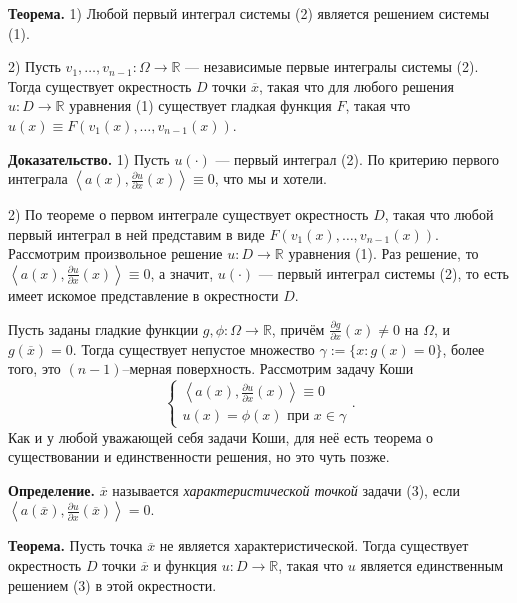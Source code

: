 \textbf{Теорема.} 1) Любой первый интеграл системы (2) является решением системы (1).

2) Пусть $v_1, \dots, v_{n-1}: \Omega \to \mathbb R$ --- независимые первые интегралы системы (2).
Тогда существует окрестность $D$ точки $\overline x$, такая что для любого решения $u: D \to \mathbb R$ уравнения (1) существует гладкая функция $F$, такая что $u(x) \equiv F(v_1(x), \dots, v_{n-1}(x))$.

\textbf{Доказательство.} 1) Пусть $u(\cdot)$ --- первый интеграл (2).
По критерию первого интеграла $\left<a(x), \frac{\partial u}{\partial x}(x) \right> \equiv 0$, что мы и хотели.

2) По теореме о первом интеграле существует окрестность $D$, такая что любой первый интеграл в ней представим в виде $F(v_1(x), \dots, v_{n-1}(x))$.
Рассмотрим произвольное решение $u: D \to \mathbb R$ уравнения (1).
Раз решение, то $\left<a(x), \frac{\partial u}{\partial x}(x) \right> \equiv 0$, а значит, $u(\cdot)$ --- первый интеграл системы (2), то есть имеет искомое представление в окрестности $D$.

\QED

Пусть заданы гладкие функции $g, \phi: \Omega \to \mathbb R$, причём $\frac{\partial g}{\partial x}(x) \ne 0$ на $\Omega$, и $g(\overline x) = 0$.
Тогда существует непустое множество $\gamma := \{x: g(x) = 0\}$, более того, это $(n-1)$--мерная поверхность.
Рассмотрим задачу Коши
\begin{equation}
    \begin{cases}
        \left<a(x), \frac{\partial u}{\partial x}(x) \right> \equiv 0 \\
        u(x) = \phi(x) \text{ при $x \in \gamma$}
    \end{cases}.
\end{equation}
Как и у любой уважающей себя задачи Коши, для неё есть теорема о существовании и единственности решения, но это чуть позже.

\textbf{Определение.} $\overline x$ называется \textit{характеристической точкой} задачи (3), если $\left<a(\overline x), \frac{\partial u}{\partial x}(\overline x) \right> = 0$.

\textbf{Теорема.} Пусть точка $\overline x$ не является характеристической.
Тогда существует окрестность $D$ точки $\overline x$ и функция $u: D \to \mathbb R$, такая что $u$ является единственным решением (3) в этой окрестности.

